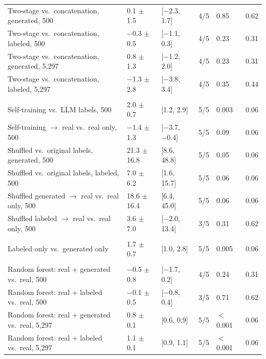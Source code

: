 \begin{tabular}{@{}llllll@{}}
\quad Two-stage vs.\ concatenation, generated, 500 & \num{+0.1} $\pm$ 1.5 & [\num{-2.3}, \num{+1.7}] & 4/5 & 0.85 & 0.62 \\
\quad Two-stage vs.\ concatenation, labeled, 500 & \num{-0.3} $\pm$ 0.5 & [\num{-1.1}, \num{+0.3}] & 4/5 & 0.23 & 0.31 \\
\quad Two-stage vs.\ concatenation, generated, 5,297 & \num{+0.8} $\pm$ 1.3 & [\num{-1.2}, \num{+2.0}] & 4/5 & 0.23 & 0.31 \\
\quad Two-stage vs.\ concatenation, labeled, 5,297 & \num{-1.3} $\pm$ 2.8 & [\num{-3.8}, \num{+3.4}] & 4/5 & 0.35 & 0.44 \\
\addlinespace
\multicolumn{6}{@{}l}{\emph{Controls with 500 real polymers}} \\
\quad Self-training vs.\ LLM labels, 500 & \num{+2.0} $\pm$ 0.7 & [\num{+1.2}, \num{+2.9}] & 5/5 & 0.003 & 0.06 \\
\quad Self-training $\rightarrow$ real vs.\ real only, 500 & \num{-1.4} $\pm$ 1.3 & [\num{-3.7}, \num{-0.4}] & 5/5 & 0.09 & 0.06 \\
\quad Shuffled vs.\ original labels, generated, 500 & \num{+21.3} $\pm$ 16.8 & [\num{+8.6}, \num{+48.8}] & 5/5 & 0.05 & 0.06 \\
\quad Shuffled vs.\ original labels, labeled, 500 & \num{+7.0} $\pm$ 6.2 & [\num{+1.6}, \num{+15.7}] & 5/5 & 0.06 & 0.06 \\
\quad Shuffled generated $\rightarrow$ real vs.\ real only, 500 & \num{+18.6} $\pm$ 16.4 & [\num{+6.4}, \num{+45.0}] & 5/5 & 0.06 & 0.06 \\
\quad Shuffled labeled $\rightarrow$ real vs.\ real only, 500 & \num{+3.6} $\pm$ 7.0 & [\num{-2.0}, \num{+13.4}] & 3/5 & 0.31 & 0.62 \\
\addlinespace
\multicolumn{6}{@{}l}{\emph{Synthetic data alone}} \\
\quad Labeled only vs.\ generated only & \num{+1.7} $\pm$ 0.7 & [\num{+1.0}, \num{+2.8}] & 5/5 & 0.005 & 0.06 \\
\addlinespace
\multicolumn{6}{@{}l}{\emph{Random forest}} \\
\quad Random forest: real + generated vs.\ real, 500 & \num{-0.5} $\pm$ 0.8 & [\num{-1.7}, \num{+0.2}] & 4/5 & 0.24 & 0.31 \\
\quad Random forest: real + labeled vs.\ real, 500 & \num{-0.1} $\pm$ 0.5 & [\num{-0.8}, \num{+0.4}] & 3/5 & 0.71 & 0.62 \\
\quad Random forest: real + generated vs.\ real, 5,297 & \num{+0.8} $\pm$ 0.1 & [\num{+0.6}, \num{+0.9}] & 5/5 & $<$0.001 & 0.06 \\
\quad Random forest: real + labeled vs.\ real, 5,297 & \num{+1.1} $\pm$ 0.1 & [\num{+0.9}, \num{+1.1}] & 5/5 & $<$0.001 & 0.06 \\
\bottomrule
\end{tabular}
